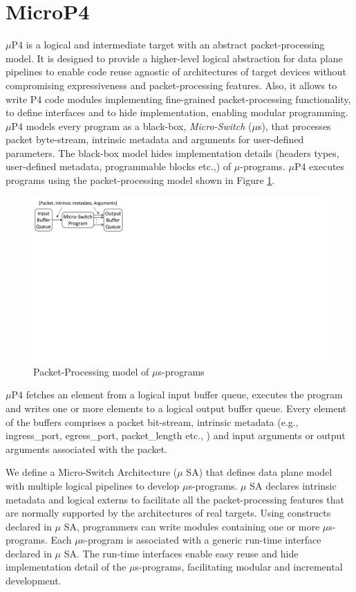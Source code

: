 \section{MicroP4}
$\mu$P4 is a logical and intermediate target with an abstract packet-processing model.
It is designed to provide a higher-level logical abstraction for data plane pipelines to enable code reuse agnostic of architectures of target devices without compromising expressiveness and packet-processing features.
Also, it allows to write P4 code modules implementing fine-grained packet-processing functionality, to define interfaces and to hide implementation, enabling modular programming.
$\mu$P4 models every program as a black-box, \emph{Micro-Switch} ($\mu$s), that processes packet byte-stream, intrinsic metadata and arguments for user-defined parameters.
The black-box model hides implementation details (headers types, user-defined metadata, programmable blocks etc.,) of $\mu$-programs.
$\mu$P4 executes programs using the packet-processing model shown in Figure \ref{fig:mp4-packet-processing-model}.
\begin{figure}[h]
    \centering
    \includegraphics[trim=0 420 667 0, clip, scale=0.5]{microp4-program-model}
    \caption{Packet-Processing model of $\mu$s-programs}
    \label{fig:mp4-packet-processing-model}
\end{figure}
$\mu$P4 fetches an element from a logical input buffer queue, executes the program and writes one or more elements to a logical output buffer queue.
Every element of the buffers comprises a packet bit-stream, intrinsic metadata (e.g., ingress\_port, egress\_port, packet\_length etc., ) and input arguments or output arguments associated with the packet.


We define a Micro-Switch Architecture ($\mu$ SA) that defines data plane model with multiple logical pipelines to develop $\mu$s-programs.
$\mu$ SA declares intrinsic metadata and logical externs to facilitate all the packet-processing features that are normally supported by the architectures of real targets.
Using constructs declared in $\mu$ SA, programmers can write modules containing one or more $\mu$s-programs.
Each $\mu$s-program is associated with a generic run-time interface declared in $\mu$ SA.
The run-time interfaces enable easy reuse and hide implementation detail of the $\mu$s-programs, facilitating modular and incremental development.

